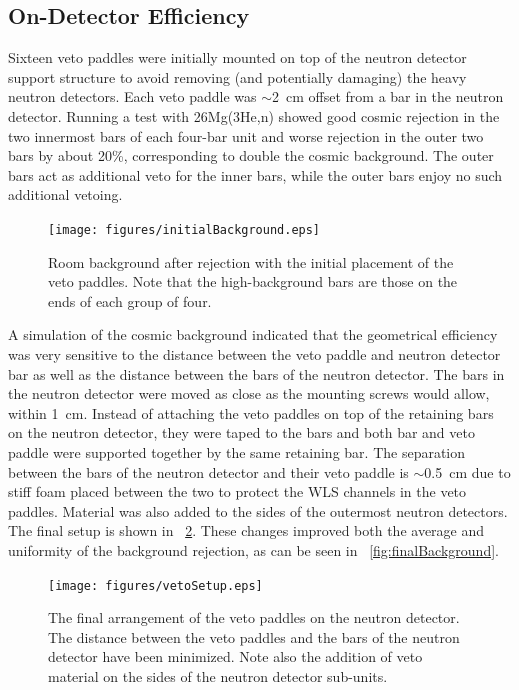 \subsection{On-Detector Efficiency}

Sixteen veto paddles were initially mounted on top of the neutron detector support structure to avoid removing (and potentially damaging) the heavy neutron detectors.  Each veto paddle was $\sim$2~cm offset from a bar in the neutron detector.  Running a test with 26Mg(3He,n) showed good cosmic rejection in the two innermost bars of each four-bar unit and worse rejection in the outer two bars by about 20\%, corresponding to double the cosmic background.  The outer bars act as additional veto for the inner bars, while the outer bars enjoy no such additional vetoing.  
\begin{figure}[htp]
\centering
\texttt{[image: figures/initialBackground.eps]}
\caption{Room background after rejection with the initial placement of the veto paddles.  Note that the high-background bars are those on the ends of each group of four.}
\label{fig:initialBackground}
\end{figure}

A simulation of the cosmic background indicated that the geometrical efficiency was very sensitive to the distance between the veto paddle and neutron detector bar as well as the distance between the bars of the neutron detector.   The bars in the neutron detector were moved as close as the mounting screws would allow, within 1~cm.  Instead of attaching the veto paddles on top of the retaining bars on the neutron detector, they were taped to the bars and both bar and veto paddle were supported together by the same retaining bar.  The separation between the bars of the neutron detector and their veto paddle is $\sim$0.5~cm due to stiff foam placed between the two to protect the WLS channels in the veto paddles.  Material was also added to the sides of the outermost neutron detectors.  The final setup is shown in {\fig}~\ref{fig:vetoSetup}.  These changes improved both the average and uniformity of the background rejection, as can be seen in {\fig}~\ref{fig:finalBackground}.
\begin{figure}[htp]
\centering
\texttt{[image: figures/vetoSetup.eps]}
\caption{The final arrangement of the veto paddles on the neutron detector.  The distance between the veto paddles and the bars of the neutron detector have been minimized.  Note also the addition of veto material on the sides of the neutron detector sub-units.}
\label{fig:vetoSetup}
\end{figure}

